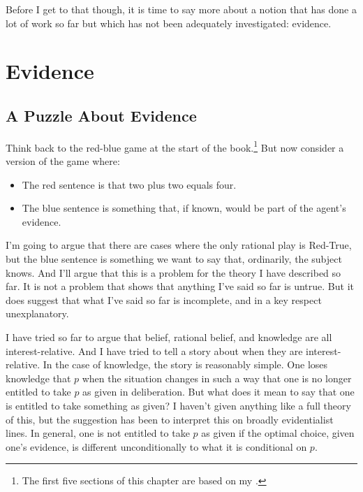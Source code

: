 \documentclass[11pt,]{book}
\providecommand{\tightlist}{%
  \setlength{\itemsep}{0pt}\setlength{\parskip}{0pt}}
\let\rmarkdownfootnote\footnote%
\def\footnote{\protect\rmarkdownfootnote}
\begin{document}
Before I get to that though, it is time to say more about a notion that has done a lot of work so far but which has not been adequately investigated: evidence.

\hypertarget{EvidenceChapter}{%
\chapter{Evidence}\label{EvidenceChapter}}

\hypertarget{evpuzzle}{%
\section{A Puzzle About Evidence}\label{evpuzzle}}

Think back to the red-blue game at the start of the book.\footnote{The first five sections of this chapter are based on my \citeyearpar{Weatherson2018-WEAIEA-2}.} But now consider a version of the game where:

\begin{itemize}
\tightlist
\item
  The red sentence is that two plus two equals four.
\item
  The blue sentence is something that, if known, would be part of the
  agent's evidence.
\end{itemize}

I'm going to argue that there are cases where the only rational play is Red-True, but the blue sentence is something we want to say that, ordinarily, the subject knows. And I'll argue that this is a problem for the theory I have described so far. It is not a problem that shows that anything I've said so far is untrue. But it does suggest that what I've said so far is incomplete, and in a key respect unexplanatory.

I have tried so far to argue that belief, rational belief, and knowledge are all interest-relative. And I have tried to tell a story about when they are interest-relative. In the case of knowledge, the story is reasonably simple. One loses knowledge that \(p\) when the situation changes in such a way that one is no longer entitled to take \(p\) as given in deliberation. But what does it mean to say that one is entitled to take something as given? I haven't given anything like a full theory of this, but the suggestion has been to interpret this on broadly evidentialist lines. In general, one is not entitled to take \(p\) as given if the optimal choice, given one's evidence, is different unconditionally to what it is conditional on \(p\).
\end{document}
